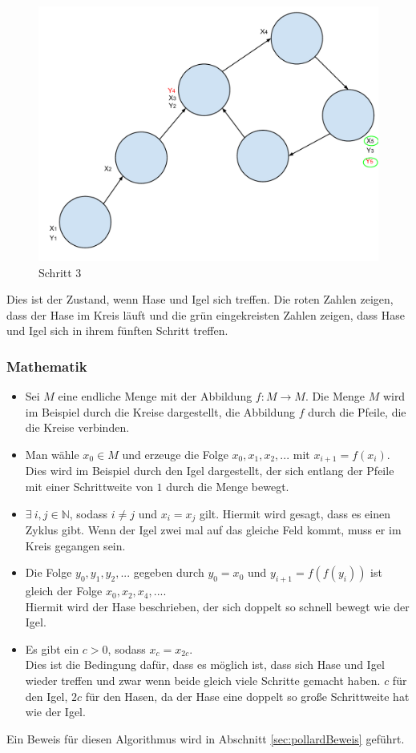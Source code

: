     \begin{figure}[!h] 
    	\centering
    	\includegraphics[width=0.7\linewidth]{Rho3}
    	\caption{Schritt 3}
    	\label{fig:Rho3)}
    \end{figure}
    Dies ist der Zustand, wenn Hase und Igel sich treffen. Die roten Zahlen zeigen, dass der Hase im Kreis l\"auft und die gr\"un eingekreisten Zahlen zeigen, dass Hase und Igel sich in ihrem f\"unften Schritt treffen. 

  \subsubsection{Mathematik}
  \begin{itemize}


  	\item Sei $M$ eine endliche Menge mit der Abbildung $f : M \rightarrow M$. Die Menge $M$ wird im Beispiel durch die Kreise dargestellt, die Abbildung $f$ durch die Pfeile, die die Kreise verbinden.
  	
  	\item Man w\"ahle $x_0 \in M$ und erzeuge die Folge $x_0, x_1, x_2,...$ mit $x_{i+1} = f(x_i)$. Dies wird im Beispiel durch den Igel dargestellt, der sich entlang der Pfeile mit einer Schrittweite von $1$ durch die Menge bewegt.
	
  	\item $\exists \ i,j \in \mathbb{N}$, sodass $i \not= j$ und $x_i = x_j$ gilt. Hiermit wird gesagt, dass es einen Zyklus gibt. Wenn der Igel zwei mal auf das gleiche Feld kommt, muss er im Kreis gegangen sein.
  	
  	\item Die Folge $y_0, y_1, y_2,...$ gegeben durch $y_0=x_0$ und $y_{i+1}=f(f(y_i))$ ist gleich der Folge $x_0,x_2,x_4,...$.\\
  Hiermit wird der Hase beschrieben, der sich doppelt so schnell bewegt wie der Igel. 
  	
  	\item Es gibt ein $c>0$, sodass $x_c=x_{2c}$.\\
  	Dies ist die Bedingung daf\"ur, dass es m\"oglich ist, dass sich Hase und Igel wieder treffen und zwar wenn beide gleich viele Schritte gemacht haben. $c$ f\"ur den Igel, $2c$ f\"ur den Hasen, da der Hase eine doppelt so gro\ss e Schrittweite hat wie der Igel.
  \end{itemize}
  
  Ein Beweis f\"ur diesen Algorithmus wird in Abschnitt \ref{sec:pollardBeweis} gef\"uhrt.